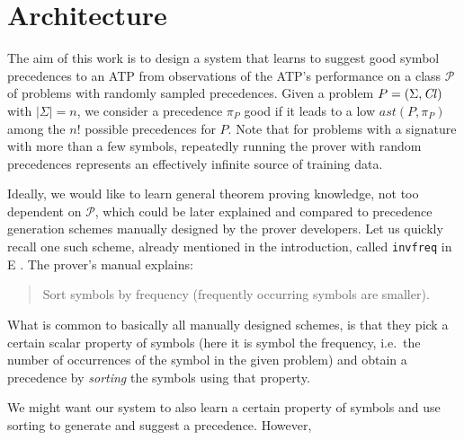 
\newpage

\section{Architecture}
\label{sec:architecture}

The aim of this work is to design a system that learns to suggest good symbol precedences to an ATP 
from observations of the ATP's performance on a class $\mathcal{P}$ of problems with randomly sampled precedences. 
Given a problem \(P = (\Sigma,\operatorname{\mathit{Cl}})\) with \(|\Sigma|=n\), we consider a precedence \(\pi_P\) good 
if it leads to a low \(\mathit{ast}(P,\pi_P)\) among the $n!$ possible precedences for \(P\).
Note that for problems with a signature with more than a few symbols, repeatedly running the prover 
with random precedences represents an effectively infinite source of training data.

Ideally, we would like to learn general theorem proving knowledge, not too dependent on $\mathcal{P}$,
which could be later explained and compared to precedence generation schemes manually designed 
by the prover developers. Let us quickly recall one such scheme, already mentioned in the introduction,
called \texttt{invfreq} in E \cite{SCV:CADE-2019}. The prover's manual \cite{E-manual} explains:
\begin{quote}
Sort symbols by frequency (frequently occurring symbols are smaller).
\end{quote}
What is common to basically all manually designed schemes, is that they pick a certain scalar property of symbols 
(here it is symbol the frequency, i.e.~the number of occurrences of the symbol in the given problem)
and obtain a precedence by \emph{sorting} the symbols using that property.

\newpage

% 









We might want our system to also learn a certain property of symbols and use sorting to generate and suggest a precedence. However, 




